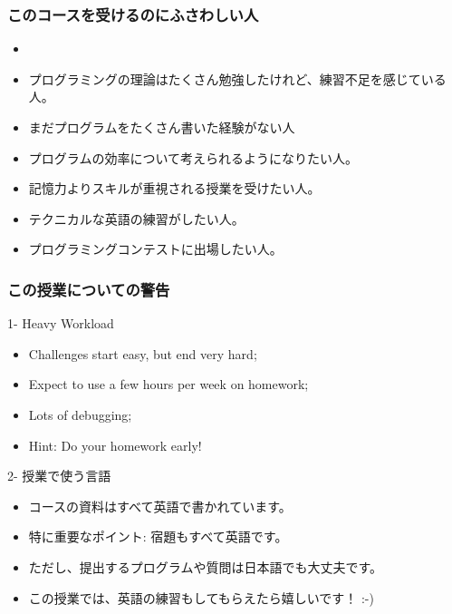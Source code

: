 \documentclass{beamer}
\begin{document}
\begin{frame}
  \frametitle{このコースを受けるのにふさわしい人}
  \begin{itemize}
  \item {}

    \smallskip
    
  \item プログラミングの理論はたくさん勉強したけれど、練習不足を感じている人。
    
    \smallskip

  \item まだプログラムをたくさん書いた経験がない人

    \smallskip

  \item プログラムの効率について考えられるようになりたい人。

    \smallskip

  \item 記憶力よりスキルが重視される授業を受けたい人。

    \smallskip

  \item テクニカルな英語の練習がしたい人。

    \smallskip

  \item プログラミングコンテストに出場したい人。
  \end{itemize}
\end{frame}

\begin{frame}
  \frametitle{この授業についての警告}
  \begin{alertblock}{1- Heavy Workload}
    \begin{itemize}
    \item Challenges start easy, but end very hard;
    \item Expect to use a few hours per week on homework;
    \item Lots of debugging;

      \bigskip

    \item Hint: Do your homework early!
    \end{itemize}
  \end{alertblock}

  \begin{alertblock}{2- 授業で使う言語}
    \begin{itemize}
    \item コースの資料はすべて英語で書かれています。
    \item 特に重要なポイント: 宿題もすべて英語です。
    \item ただし、提出するプログラムや質問は日本語でも大丈夫です。

      \bigskip

    \item この授業では、英語の練習もしてもらえたら嬉しいです！ :-)
    \end{itemize}
  \end{alertblock}

\end{frame}
\end{document}
